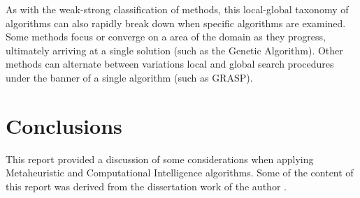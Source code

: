 \documentclass[a4paper, 11pt]{article}
\begin{document}
As with the weak-strong classification of methods, this local-global taxonomy of algorithms can also rapidly break down when specific algorithms are examined.
Some methods focus or converge on a area of the domain as they progress, ultimately arriving at a single solution (such as the Genetic Algorithm). Other methods can alternate between variations local and global search procedures under the banner of a single algorithm (such as GRASP). 



\section{Conclusions}
\label{sec:conclusions}
This report provided a discussion of some considerations when applying Metaheuristic and Computational Intelligence algorithms.
Some of the content of this report was derived from the dissertation work of the author \cite{Brownlee2008}.



\end{document}
